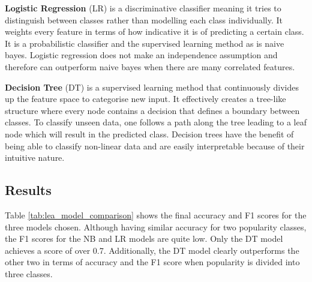 \documentclass{article}
\begin{document}




\textbf{Logistic Regression} (LR) is a discriminative classifier meaning it tries to distinguish between classes rather than modelling each class individually. It weights every feature in terms of how indicative it is of predicting a certain class. It is a probabilistic classifier and the supervised learning method as is naive bayes. 
Logistic regression does not make an independence assumption and therefore can outperform naive bayes when there are many correlated features.

\textbf{Decision Tree} (DT) is a supervised learning method that continuously divides up the feature space to categorise new input. It effectively creates a tree-like structure where every node contains a decision that defines a boundary between classes. To classify unseen data, one follows a path along the tree leading to a leaf node which will result in the predicted class. Decision trees have the benefit of being able to classify non-linear data and are easily interpretable because of their intuitive nature. 

\subsection{Results}
Table \ref{tab:lea_model_comparison} shows the final accuracy and F1 scores for the three models chosen. Although having similar accuracy for two popularity classes, the F1 scores for the NB and LR models are quite low. Only the DT model achieves a score of over 0.7. Additionally, the DT model clearly outperforms the other two in terms of accuracy and the F1 score when popularity is divided into three classes.
\end{document}
